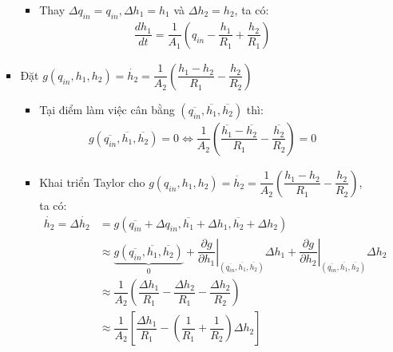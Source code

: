 \begin{enumerate}[\it a.]
\begin{itemize}
\begin{itemize}
\begin{itemize}
                                \item Thay $\Delta q_{in} = q_{in}, \Delta h_1 = h_1$ và $\Delta h_2 = h_2$, ta có:
                                    \begin{align}
                                        \dfrac{dh_1}{dt} = \dfrac{1}{A_1} \left({q_{in} - \dfrac{h_1}{R_1} + \dfrac{h_2}{R_1}}\right)
                                    \end{align}
                            \end{itemize}

                        \item Đặt $g\left({q_{in}, h_1, h_2}\right) = \dot{h_2} = \dfrac{1}{A_2} \left({\dfrac{h_1 - h_2}{R_1} - \dfrac{h_2}{R_2}}\right)$
                            \begin{itemize}
                                \item Tại điểm làm việc cân bằng $\left({\overline{q_{in}}, \overline{h_1}, \overline{h_2}}\right)$ thì:
                                    \begin{align}
                                        g\left({\overline{q_{in}}, \overline{h_1}, \overline{h_2}}\right) = 0 \Longleftrightarrow \dfrac{1}{A_2} \left({\dfrac{\overline{h_1} - \overline{h_2}}{R_1} - \dfrac{\overline{h_2}}{R_2}}\right) = 0
                                    \end{align}

                                \item Khai triển Taylor cho $g\left({q_{in}, h_1, h_2}\right) = \dot{h_2} = \dfrac{1}{A_2} \left({\dfrac{h_1 - h_2}{R_1} - \dfrac{h_2}{R_2}}\right)$, ta có:
                                    \begin{align}
                                        \dot{h_2} = \Delta \dot{h_2} & = g\left({\overline{q_{in}} + \Delta q_{in}, \overline{h_1} + \Delta h_1, \overline{h_2} + \Delta h_2}\right) \\
                                        & \approx \underbrace{g\left({\overline{q_{in}}, \overline{h_1}, \overline{h_2}}\right)}_{0} + \left.\dfrac{\partial g}{\partial h_1}\right|_{\left({\overline{q_{in}}, \overline{h_1}, \overline{h_2}}\right)} \Delta h_1 + \left.\dfrac{\partial g}{\partial h_2}\right|_{\left({\overline{q_{in}}, \overline{h_1}, \overline{h_2}}\right)} \Delta h_2\\
                                        & \approx \dfrac{1}{A_2} \left({\dfrac{\Delta h_1}{R_1} - \dfrac{\Delta h_2}{R_1} - \dfrac{\Delta h_2}{R_2}}\right)\\
                                        & \approx \dfrac{1}{A_2} \left[{\dfrac{\Delta h_1}{R_1} - \left({\dfrac{1}{R_1} + \dfrac{1}{R_2}}\right) \Delta h_2}\right]
                                    \end{align}


\end{itemize}
\end{itemize}
\end{itemize}
\end{enumerate}
